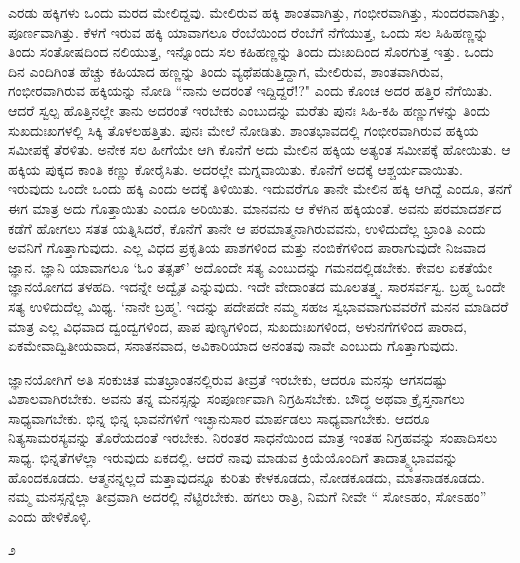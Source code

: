 ಎರಡು ಹಕ್ಕಿಗಳು ಒಂದು ಮರದ ಮೇಲಿದ್ದವು. ಮೇಲಿರುವ ಹಕ್ಕಿ ಶಾಂತವಾಗಿತ್ತು, ಗಂಭೀರವಾಗಿತ್ತು, ಸುಂದರವಾಗಿತ್ತು, ಪೂರ್ಣವಾಗಿತ್ತು. ಕೆಳಗೆ ಇರುವ ಹಕ್ಕಿ ಯಾವಾಗಲೂ ರೆಂಬೆಯಿಂದ ರೆಂಬೆಗೆ ನೆಗೆಯುತ್ತ, ಒಂದು ಸಲ ಸಿಹಿಹಣ್ಣನ್ನು ತಿಂದು ಸಂತೋಷದಿಂದ ನಲಿಯುತ್ತ, ಇನ್ನೊಂದು ಸಲ ಕಹಿಹಣ್ಣನ್ನು ತಿಂದು ದುಃಖದಿಂದ ಸೊರಗುತ್ತ ಇತ್ತು. ಒಂದು ದಿನ ಎಂದಿಗಿಂತ ಹೆಚ್ಚು ಕಹಿಯಾದ ಹಣ್ಣನ್ನು ತಿಂದು ವ್ಯಥೆಪಡುತ್ತಿದ್ದಾಗ, ಮೇಲಿರುವ, ಶಾಂತವಾಗಿರುವ, ಗಂಭೀರವಾಗಿರುವ ಹಕ್ಕಿಯನ್ನು ನೋಡಿ “ನಾನು ಅದರಂತೆ ಇದ್ದಿದ್ದರೆ!?" ಎಂದು ಕೊಂಚ ಅದರ ಹತ್ತಿರ ನೆಗೆಯಿತು. ಆದರೆ ಸ್ವಲ್ಪ ಹೊತ್ತಿನಲ್ಲೇ ತಾನು ಅದರಂತೆ ಇರಬೇಕು ಎಂಬುದನ್ನು ಮರೆತು ಪುನಃ ಸಿಹಿ-ಕಹಿ ಹಣ್ಣುಗಳನ್ನು ತಿಂದು ಸುಖದುಃಖಗಳಲ್ಲಿ ಸಿಕ್ಕಿ ತೊಳಲಹತ್ತಿತು. ಪುನಃ ಮೇಲೆ ನೋಡಿತು. ಶಾಂತಭಾವದಲ್ಲಿ ಗಂಭೀರವಾಗಿರುವ ಹಕ್ಕಿಯ ಸಮೀಪಕ್ಕೆ ತೆರಳಿತು. ಅನೇಕ ಸಲ ಹೀಗೆಯೇ ಆಗಿ ಕೊನೆಗೆ ಅದು ಮೇಲಿನ ಹಕ್ಕಿಯ ಅತ್ಯಂತ ಸಮೀಪಕ್ಕೆ ಹೋಯಿತು. ಆ ಹಕ್ಕಿಯ ಪುಕ್ಕದ ಕಾಂತಿ ಕಣ್ಣು ಕೋರೈಸಿತು. ಅದರಲ್ಲೇ ಮಗ್ನವಾಯಿತು. ಕೊನೆಗೆ ಅದಕ್ಕೆ ಆಶ್ಚರ್ಯವಾಯಿತು. ಇರುವುದು ಒಂದೇ ಒಂದು ಹಕ್ಕಿ ಎಂದು ಅದಕ್ಕೆ ತಿಳಿಯಿತು. ಇದುವರೆಗೂ ತಾನೇ ಮೇಲಿನ ಹಕ್ಕಿ ಆಗಿದ್ದೆ ಎಂದೂ, ತನಗೆ ಈಗ ಮಾತ್ರ ಅದು ಗೊತ್ತಾಯಿತು ಎಂದೂ ಅರಿಯಿತು. ಮಾನವನು ಆ ಕೆಳಗಿನ ಹಕ್ಕಿಯಂತೆ. ಅವನು ಪರಮಾದರ್ಶದ ಕಡೆಗೆ ಹೋಗಲು ಸತತ ಯತ್ನಿಸಿದರೆ, ಕೊನೆಗೆ ತಾನೇ ಆ ಪರಮಾತ್ಮನಾಗಿರುವವನು, ಉಳಿದುದೆಲ್ಲ ಭ್ರಾಂತಿ ಎಂದು ಅವನಿಗೆ ಗೊತ್ತಾಗುವುದು. ಎಲ್ಲ ವಿಧದ ಪ್ರಕೃತಿಯ ಪಾಶಗಳಿಂದ ಮತ್ತು ನಂಬಿಕೆಗಳಿಂದ ಪಾರಾಗುವುದೇ ನಿಜವಾದ ಜ್ಞಾನ. ಜ್ಞಾನಿ ಯಾವಾಗಲೂ `ಓಂ ತತ್ಸತ್' ಅದೊಂದೇ ಸತ್ಯ ಎಂಬುದನ್ನು ಗಮನದಲ್ಲಿಡಬೇಕು. ಕೇವಲ ಏಕತೆಯೇ ಜ್ಞಾನಯೋಗದ ತಳಹದಿ. ಇದನ್ನೇ ಅದ್ವೈತ ಎನ್ನುವುದು. ಇದೇ ವೇದಾಂತದ ಮೂಲತತ್ತ್ವ. ಸಾರಸರ್ವಸ್ವ. ಬ್ರಹ್ಮ ಒಂದೇ ಸತ್ಯ ಉಳಿದುದೆಲ್ಲ ಮಿಥ್ಯ. `ನಾನೇ ಬ್ರಹ್ಮ'. ಇದನ್ನು ಪದೇಪದೇ ನಮ್ಮ ಸಹಜ ಸ್ವಭಾವವಾಗುವವರೆಗೆ ಮನನ ಮಾಡಿದರೆ ಮಾತ್ರ ಎಲ್ಲ ವಿಧವಾದ ದ್ವಂದ್ವಗಳಿಂದ, ಪಾಪ ಪುಣ್ಯಗಳಿಂದ, ಸುಖದುಃಖಗಳಿಂದ, ಅಳುನಗೆಗಳಿಂದ ಪಾರಾದ, ಏಕಮೇವಾದ್ವಿತೀಯವಾದ, ಸನಾತನವಾದ, ಅವಿಕಾರಿಯಾದ ಅನಂತವು ನಾವೇ ಎಂಬುದು ಗೊತ್ತಾಗುವುದು.

ಜ್ಞಾನಯೋಗಿಗೆ ಅತಿ ಸಂಕುಚಿತ ಮತಭ್ರಾಂತನಲ್ಲಿರುವ ತೀವ್ರತೆ ಇರಬೇಕು, ಆದರೂ ಮನಸ್ಸು ಆಗಸದಷ್ಟು ವಿಶಾಲವಾಗಿರಬೇಕು. ಅವನು ತನ್ನ ಮನಸ್ಸನ್ನು ಸಂಪೂರ್ಣವಾಗಿ ನಿಗ್ರಹಿಸಬೇಕು. ಬೌದ್ಧ ಅಥವಾ ಕ್ರೈಸ್ತನಾಗಲು ಸಾಧ್ಯವಾಗಬೇಕು. ಭಿನ್ನ ಭಿನ್ನ ಭಾವನೆಗಳಿಗೆ ಇಚ್ಛಾನುಸಾರ ಮಾರ್ಪಡಲು ಸಾಧ್ಯವಾಗಬೇಕು. ಆದರೂ ನಿತ್ಯಸಾಮರಸ್ಯವನ್ನು ತೊರೆಯದಂತೆ ಇರಬೇಕು. ನಿರಂತರ ಸಾಧನೆಯಿಂದ ಮಾತ್ರ ಇಂತಹ ನಿಗ್ರಹವನ್ನು ಸಂಪಾದಿಸಲು ಸಾಧ್ಯ. ಭಿನ್ನತೆಗಳೆಲ್ಲಾ ಇರುವುದು ಏಕದಲ್ಲಿ. ಆದರೆ ನಾವು ಮಾಡುವ ಕ್ರಿಯೆಯೊಂದಿಗೆ ತಾದಾತ್ಮ್ಯಭಾವವನ್ನು ಹೊಂದಕೂಡದು. ಆತ್ಮನನ್ನಲ್ಲದೆ ಮತ್ತಾವುದನ್ನೂ ಕುರಿತು ಕೇಳಕೂಡದು, ನೋಡಕೂಡದು, ಮಾತನಾಡಕೂಡದು. ನಮ್ಮ ಮನಸ್ಸನ್ನೆಲ್ಲಾ ತೀವ್ರವಾಗಿ ಅದರಲ್ಲಿ ನೆಟ್ಟಿರಬೇಕು. ಹಗಲು ರಾತ್ರಿ, ನಿಮಗೆ ನೀವೇ `` ಸೋಽಹಂ, ಸೋಽಹಂ'' ಎಂದು ಹೇಳಿಕೊಳ್ಳಿ.

\begin{center}
೨
\end{center}

